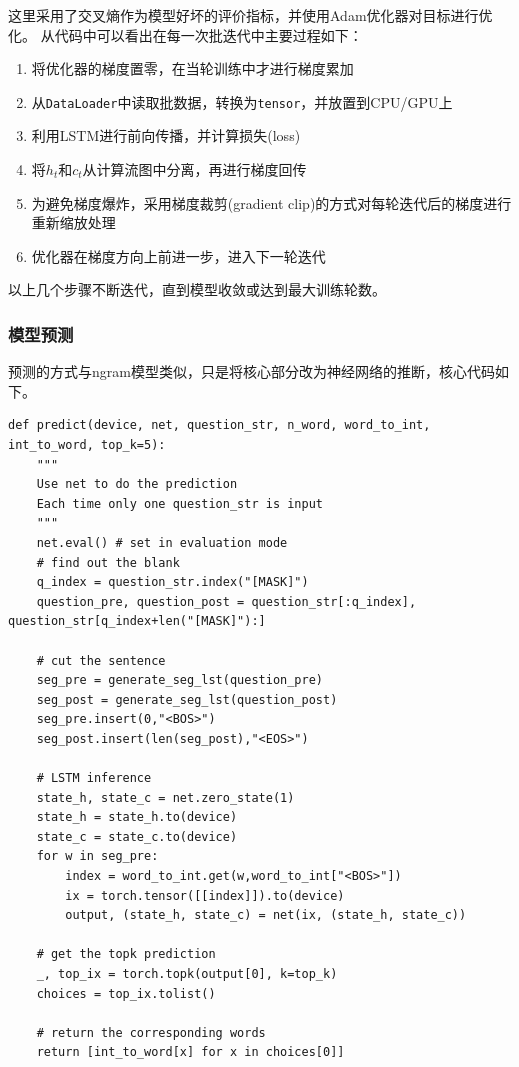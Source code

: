 \documentclass[logo,reportComp]{thesis}
\begin{document}
这里采用了交叉熵作为模型好坏的评价指标，并使用Adam优化器对目标进行优化。
从代码中可以看出在每一次批迭代中主要过程如下：
\begin{enumerate}
\item 将优化器的梯度置零，在当轮训练中才进行梯度累加
\item 从\verb'DataLoader'中读取批数据，转换为\verb'tensor'，并放置到CPU/GPU上
\item 利用LSTM进行前向传播，并计算损失(loss)
\item 将$h_t$和$c_t$从计算流图中分离，再进行梯度回传
\item 为避免梯度爆炸，采用梯度裁剪(gradient clip)\cite{bib:gradient_clipping}的方式对每轮迭代后的梯度进行重新缩放处理
\item 优化器在梯度方向上前进一步，进入下一轮迭代
\end{enumerate}
以上几个步骤不断迭代，直到模型收敛或达到最大训练轮数。

\subsubsection{模型预测}
预测的方式与ngram模型类似，只是将核心部分改为神经网络的推断，核心代码如下。
\begin{lstlisting}
def predict(device, net, question_str, n_word, word_to_int, int_to_word, top_k=5):
    """
    Use net to do the prediction
    Each time only one question_str is input
    """
    net.eval() # set in evaluation mode
    # find out the blank
    q_index = question_str.index("[MASK]")
    question_pre, question_post = question_str[:q_index], question_str[q_index+len("[MASK]"):]

    # cut the sentence
    seg_pre = generate_seg_lst(question_pre)
    seg_post = generate_seg_lst(question_post)
    seg_pre.insert(0,"<BOS>")
    seg_post.insert(len(seg_post),"<EOS>")

    # LSTM inference
    state_h, state_c = net.zero_state(1)
    state_h = state_h.to(device)
    state_c = state_c.to(device)
    for w in seg_pre:
        index = word_to_int.get(w,word_to_int["<BOS>"])
        ix = torch.tensor([[index]]).to(device)
        output, (state_h, state_c) = net(ix, (state_h, state_c))

    # get the topk prediction
    _, top_ix = torch.topk(output[0], k=top_k)
    choices = top_ix.tolist()

    # return the corresponding words
    return [int_to_word[x] for x in choices[0]]
\end{lstlisting}
\end{document}

